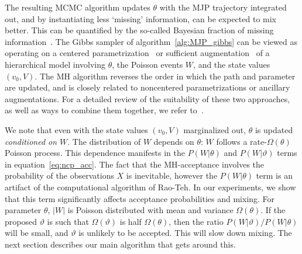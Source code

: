 \vspace{-.1in}
The resulting MCMC algorithm updates $\theta$ with the MJP trajectory 
integrated out, and by instantiating less `missing' information, can be expected to mix better. 
This can be quantified by the so-called Bayesian fraction of missing information~\citep{liu1994fraction, papaspiliopoulos2007general}. 
The Gibbs sampler of algorithm~\ref{alg:MJP_gibbs} can be viewed as operating on a centered parametrization~\citep{papaspiliopoulos2007general} or sufficient augmentation~\citep{yu2011center} of a hierarchical model involving $\theta$, the Poisson events $W$, and the state values $(v_0,V)$. The MH algorithm reverses the order in which the path and parameter are updated, and is closely related to noncentered parametrizations or ancillary augmentations. 
For a detailed review of the suitability of these two approaches, as well as ways to combine them together, we refer to~\citet{papaspiliopoulos2007general, yu2011center}.

We note that even with the state values $(v_0,V)$ marginalized out, $\theta$ is updated {\em conditioned on $W$}. 
The distribution of $W$ depends on $\theta$: $W$ follows a rate-$\Omega(\theta)$ Poisson process. This dependence manifests in the $P(W|\theta)$ and $P(W|\vartheta)$ terms in equation~\eqref{eq:ncp_acc}. 
The fact that the MH-acceptance involves the probability of the observations  $X$ is inevitable, however the $P(W|\theta)$ term is an artifact of the computational algorithm of Rao-Teh. 
In our experiments, we show that this term significantly affects acceptance probabilities and mixing. 
For parameter $\theta$, $|W|$ is Poisson distributed with mean and variance $\Omega(\theta)$. 
If the proposed $\vartheta$ is such that $\Omega(\vartheta)$ is half $\Omega(\theta)$, then the ratio $P(W|\vartheta)/P(W|\theta)$ will be small, and $\vartheta$ is unlikely to be accepted. 
This will slow down mixing.
The next section describes our main algorithm that gets around this.
